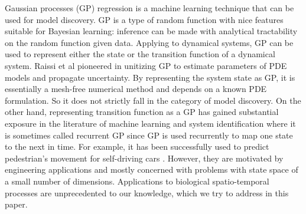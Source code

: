 \documentclass[smallextended,natbib]{svjour3}       %
\begin{document}
Gaussian processes (GP) regression is a machine learning technique that can be used for model discovery. GP is a type of random function with nice features suitable for Bayesian learning: inference can be made with analytical tractability on the random function given data. Applying to dynamical systems, GP can be used to represent either the state or the transition function of a dynamical system.   Raissi et al \citep{Raissi2018,Raissi2018a} pioneered in unitizing GP to estimate parameters of PDE models and propagate uncertainty.  By representing the system state as GP, it is essentially a mesh-free numerical method and depends on a known PDE formulation. So it does not strictly fall in the category of model discovery. On the other hand, representing transition function as a GP has gained substantial exposure in the literature of machine learning and system identification \citep{girard2003gaussian,deisenroth2009analytic} where it is sometimes called recurrent GP since GP is used recurrently to map one state to the next in time. For example, it has been successfully used to predict pedestrian's movement for self-driving cars \citep{Wang2008}. However, they are motivated by engineering applications and mostly concerned with problems with state space of a small number of dimensions. Applications to biological spatio-temporal processes are unprecedented to our knowledge, which we try to address in this paper.
\end{document}
